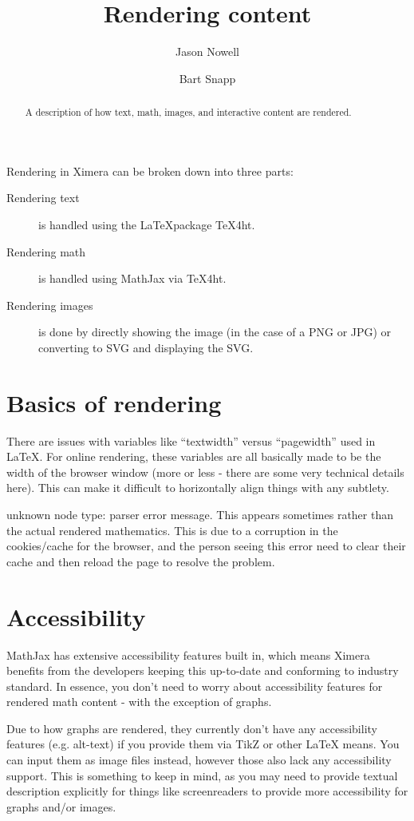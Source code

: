 \documentclass{ximera}
\title{Rendering content}
\author{Jason Nowell \and Bart Snapp}
\begin{document}
\begin{abstract}
    A description of how text, math, images, and interactive content are
    rendered.
\end{abstract}
\maketitle

Rendering in Ximera can be broken down into three parts:
\begin{description}
    \item[Rendering text] is handled using the \LaTeX package TeX4ht.
    \item[Rendering math] is handled using MathJax via TeX4ht.
    \item[Rendering images] is done by directly showing the image (in the case
        of a PNG or JPG) or converting to SVG and displaying the SVG.
\end{description}

\section{Basics of rendering}

There are issues with variables like ``textwidth'' versus
``pagewidth'' used in LaTeX. For online rendering, these variables are all
basically made to be the width of the browser window (more or less - there are
some very technical details here). This can make it difficult to horizontally
align things with any subtlety.


unknown node type: parser error message. This appears
          sometimes rather than the actual rendered mathematics. This is due to a
          corruption in the cookies/cache for the browser, and the person seeing this
          error need to clear their cache and then reload the page to resolve the
          problem.








\section{Accessibility}
MathJax has extensive accessibility features built in, which means
Ximera benefits from the developers keeping this up-to-date and conforming to
industry standard. In essence, you don't need to worry about accessibility
features for rendered math content - with the exception of graphs.

Due to how graphs are rendered, they currently don't have any
accessibility features (e.g. alt-text) if you provide them via TikZ or other
LaTeX means. You can input them as image files instead, however those also lack
any accessibility support. This is something to keep in mind, as you may need
to provide textual description explicitly for things like screenreaders to
provide more accessibility for graphs and/or images.
\end{document}
